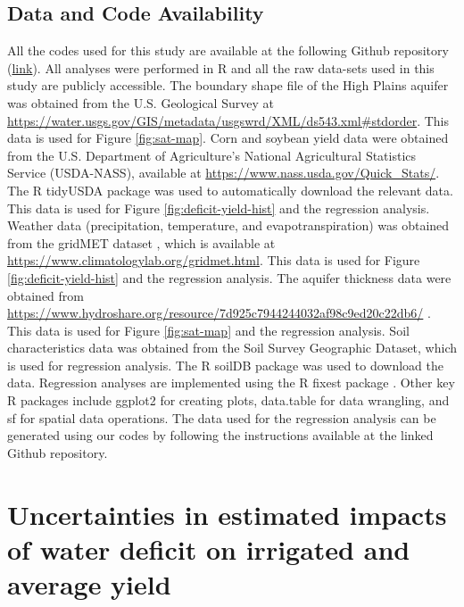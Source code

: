 \documentclass[
]{article}
\begin{document}
\hypertarget{data-and-code-availability}{%
\subsection{Data and Code Availability}\label{data-and-code-availability}}

All the codes used for this study are available at the following Github repository (\href{https://github.com/tmieno2/Drought-Production-Risk-Aquifer}{link}). All analyses were performed in R \citep{R} and all the raw data-sets used in this study are publicly accessible. The boundary shape file of the High Plains aquifer was obtained from the U.S. Geological Survey at \url{https://water.usgs.gov/GIS/metadata/usgswrd/XML/ds543.xml#stdorder}. This data is used for Figure \ref{fig:sat-map}. Corn and soybean yield data were obtained from the U.S. Department of Agriculture's National Agricultural Statistics Service (USDA-NASS), available at \url{https://www.nass.usda.gov/Quick_Stats/}. The R tidyUSDA package \citep{RtidyUSDA} was used to automatically download the relevant data. This data is used for Figure \ref{fig:deficit-yield-hist} and the regression analysis. Weather data (precipitation, temperature, and evapotranspiration) was obtained from the gridMET dataset \citep{Abatzoglou2013}, which is available at \url{https://www.climatologylab.org/gridmet.html}. This data is used for Figure \ref{fig:deficit-yield-hist} and the regression analysis. The aquifer thickness data were obtained from \url{https://www.hydroshare.org/resource/7d925c7944244032af98c9ed20c22db6/} \citep{haacker2023}. This data is used for Figure \ref{fig:sat-map} and the regression analysis. Soil characteristics data was obtained from the Soil Survey Geographic Dataset, which is used for regression analysis. The R soilDB package \citep{Rsoildb} was used to download the data. Regression analyses are implemented using the R fixest package \citep{Rfixest}. Other key R packages include ggplot2 \citep{Rggplot2} for creating plots, data.table \citep{Rdatatable} for data wrangling, and sf \citep{Rsf} for spatial data operations. The data used for the regression analysis can be generated using our codes by following the instructions available at the linked Github repository.

\clearpage

\hypertarget{appendix-appendix}{%
\appendix}


\hypertarget{reg-conf}{%
\section{Uncertainties in estimated impacts of water deficit on irrigated and average yield}\label{reg-conf}}
\end{document}

